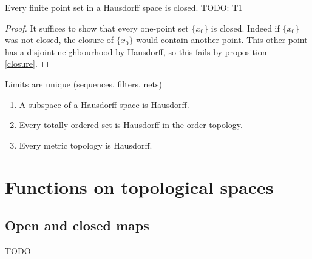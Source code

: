 \begin{proposition}
Every finite point set in a Hausdorff space is closed. TODO: T1
\end{proposition}
\begin{proof}
It suffices to show that every one-point set $\{x_0\}$ is closed. Indeed if $\{x_0\}$ was not closed, the closure of $\{x_0\}$ would contain another point. This other point has a disjoint neighbourhood by Hausdorff, so this fails by proposition \ref{closure}.
\end{proof}
\begin{proposition}
Limits are unique (sequences, filters, nets)
\end{proposition}
\begin{lemma}
\begin{enumerate}
\item A subspace of a Hausdorff space is Hausdorff.
\item Every totally ordered set is Hausdorff in the order topology.
\item Every metric topology is Hausdorff.
\end{enumerate}
\end{lemma}



\section{Functions on topological spaces}
\subsection{Open and closed maps}
TODO

